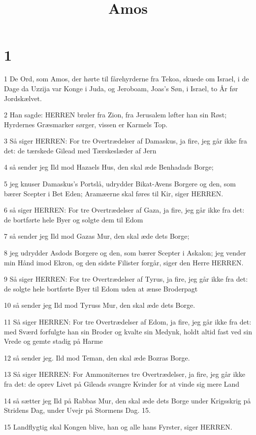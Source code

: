 

\title{Amos}


\chapter{1}

\par 1 De Ord, som Amos, der hørte til fårehyrderne fra Tekoa, skuede om Israel, i de Dage da Uzzija var Konge i Juda, og Jeroboam, Joas's Søn, i Israel, to År før Jordskælvet.
\par 2 Han sagde: HERREN brøler fra Zion, fra Jerusalem løfter han sin Røst; Hyrdernes Græsmarker sørger, vissen er Karmels Top.
\par 3 Så siger HERREN: For tre Overtrædelser af Damaskus, ja fire, jeg går ikke fra det: de tærskede Gilead med Tærskeslæder af Jern
\par 4 så sender jeg Ild mod Hazaels Hus, den skal æde Benhadads Borge;
\par 5 jeg knuser Damaskus's Portslå, udrydder Bikat-Avens Borgere og den, som bærer Scepter i Bet Eden; Aramæerne skal føres til Kir, siger HERREN.
\par 6 så siger HERREN: For tre Overtrædelser af Gaza, ja fire, jeg går ikke fra det: de bortførte hele Byer og solgte dem til Edom
\par 7 så sender jeg Ild mod Gazas Mur, den skal æde dets Borge;
\par 8 jeg udrydder Asdods Borgere og den, som bærer Scepter i Askalon; jeg vender min Hånd imod Ekron, og den sidste Filister forgår, siger den Herre HERREN.
\par 9 Så siger HERREN: For tre Overtrædelser af Tyrus, ja fire, jeg går ikke fra det: de solgte hele bortførte Byer til Edom uden at ænse Broderpagt
\par 10 så sender jeg Ild mod Tyruss Mur, den skal æde dets Borge.
\par 11 Så siger HERREN: For tre Overtrædelser af Edom, ja fire, jeg går ikke fra det: med Sværd forfulgte han sin Broder og kvalte sin Medynk, holdt altid fast ved sin Vrede og gemte stadig på Harme
\par 12 så sender jeg. Ild mod Teman, den skal æde Bozras Borge.
\par 13 Så siger HERREN: For Ammoniternes tre Overtrædelser, ja fire, jeg går ikke fra det: de oprev Livet på Gileads svangre Kvinder for at vinde sig mere Land
\par 14 så sætter jeg Ild på Rabbas Mur, den skal æde dets Borge under Krigsskrig på Stridens Dag, under Uvejr på Stormens Dag. 15.
\par 15 Landflygtig skal Kongen blive, han og alle hans Fyrster, siger HERREN.

